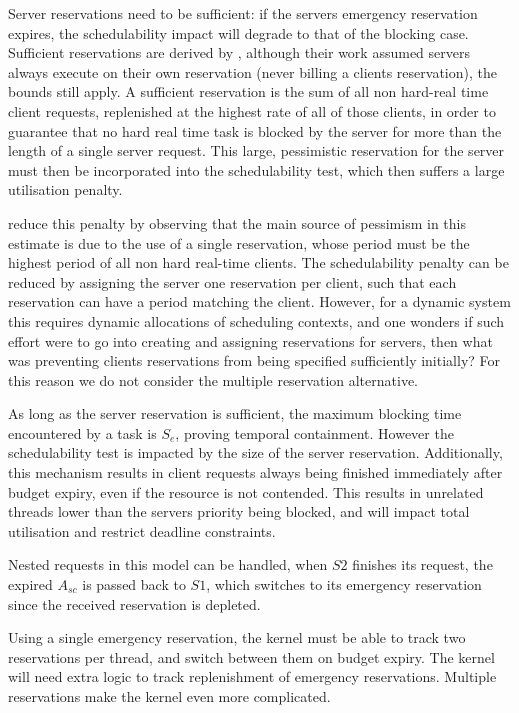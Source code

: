 Server reservations need to be sufficient: if the servers emergency reservation expires, the schedulability impact will degrade to that of the blocking case.
Sufficient reservations are derived by \citep{deNiz_LSR_2001}, although their work assumed servers always execute on their own reservation (never billing a clients reservation), the bounds still apply.
A sufficient reservation is the sum of all non hard-real time client requests, replenished at the highest rate of all of those clients, in order to guarantee that no hard real time task is blocked by the server for more than the length of a single server request.
This large, pessimistic reservation for the server must then be incorporated into the schedulability test, which then suffers a large utilisation penalty.

 reduce this penalty by observing that the main source of pessimism in this estimate is due to the use of a single reservation, whose period must be the highest period of all non hard real-time clients.
The schedulability penalty can be reduced by assigning the server one reservation per client, such that each reservation can have a period matching the client.
However, for a dynamic system this requires dynamic allocations of scheduling contexts, and one wonders if such effort were to go into creating and assigning reservations for servers, then what was preventing clients reservations from being specified sufficiently initially?
For this reason we do not consider the multiple reservation alternative.

As long as the server reservation is sufficient, the maximum blocking time encountered by a task is $S_{e}$, proving temporal containment.
However the schedulability test is impacted by the size of the server reservation.
Additionally, this mechanism results in client requests always being finished immediately after budget expiry, even if the resource is not contended.
This results in unrelated threads lower than the servers priority being blocked, and will impact total utilisation and restrict deadline constraints.

Nested requests in this model can be handled, when $S2$ finishes its request, the expired $A_{sc}$ is passed back to $S1$, which switches to its emergency reservation since the received reservation is depleted.

Using a single emergency reservation, the kernel must be able to track two reservations per thread, and switch between them on budget expiry.
The kernel will need extra logic to track replenishment of emergency reservations.
Multiple reservations make the kernel even more complicated.

